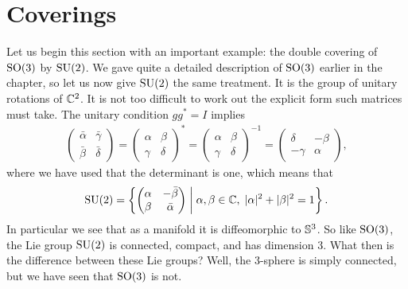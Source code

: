 \section{Coverings}

Let us begin this section with an important example: the double covering of $\mathrm{SO}(3)$ by $\mathrm{SU}(2)$.
We gave quite a detailed description of $\mathrm{SO}(3)$ earlier in the chapter, so let us now give $\mathrm{SU}(2)$ the same treatment.
It is the group of unitary rotations of $\mathbb{C}^2$.
It is not too difficult to work out the explicit form such matrices must take.
The unitary condition $gg^\ast = I$ implies
\begin{align*}
\begin{pmatrix}
\bar{\alpha} & \bar{\gamma} \\ \bar{\beta} & \bar{\delta}
\end{pmatrix}
=
\begin{pmatrix}
\alpha & \beta \\ \gamma & \delta
\end{pmatrix}^\ast
= \begin{pmatrix}
\alpha & \beta \\ \gamma & \delta
\end{pmatrix}^{-1}
= \begin{pmatrix}
\delta & - \beta \\ - \gamma & \alpha
\end{pmatrix},
\end{align*}
where we have used that the determinant is one, which means that
\[
\mathrm{SU}(2) 
= \left\{ \begin{pmatrix} \alpha & -\bar{\beta} \\ \beta & \bar{\alpha} \end{pmatrix} \;\middle|\; \alpha,\beta \in \mathbb{C},\; |\alpha|^2 + |\beta|^2 = 1 \right\}.
\]
In particular we see that as a manifold it is diffeomorphic to $\mathbb{S}^3$.
So like $\mathrm{SO}(3)$, the Lie group $\mathrm{SU}(2)$ is connected, compact, and has dimension 3.
What then is the difference between these Lie groups?
Well, the $3$-sphere is simply connected, but we have seen that $\mathrm{SO}(3)$ is not.

